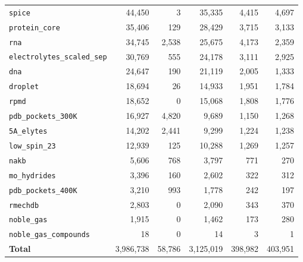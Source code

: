 \begin{table}[h]
\begin{tabular}{lrrrrr}
\texttt{spice} & 44{,}450 & 3 & 35{,}335 & 4{,}415 & 4{,}697 \\
\texttt{protein\_core} & 35{,}406 & 129 & 28{,}429 & 3{,}715 & 3{,}133 \\
\texttt{rna} & 34{,}745 & 2{,}538 & 25{,}675 & 4{,}173 & 2{,}359 \\
\texttt{electrolytes\_scaled\_sep} & 30{,}769 & 555 & 24{,}178 & 3{,}111 & 2{,}925 \\
\texttt{dna} & 24{,}647 & 190 & 21{,}119 & 2{,}005 & 1{,}333 \\
\texttt{droplet} & 18{,}694 & 26 & 14{,}933 & 1{,}951 & 1{,}784 \\
\texttt{rpmd} & 18{,}652 & 0 & 15{,}068 & 1{,}808 & 1{,}776 \\
\texttt{pdb\_pockets\_300K} & 16{,}927 & 4{,}820 & 9{,}689 & 1{,}150 & 1{,}268 \\
\texttt{5A\_elytes} & 14{,}202 & 2{,}441 & 9{,}299 & 1{,}224 & 1{,}238 \\
\texttt{low\_spin\_23} & 12{,}939 & 125 & 10{,}288 & 1{,}269 & 1{,}257 \\
\texttt{nakb} & 5{,}606 & 768 & 3{,}797 & 771 & 270 \\
\texttt{mo\_hydrides} & 3{,}396 & 160 & 2{,}602 & 322 & 312 \\
\texttt{pdb\_pockets\_400K} & 3{,}210 & 993 & 1{,}778 & 242 & 197 \\
\texttt{rmechdb} & 2{,}803 & 0 & 2{,}090 & 343 & 370 \\
\texttt{noble\_gas} & 1{,}915 & 0 & 1{,}462 & 173 & 280 \\
\texttt{noble\_gas\_compounds} & 18 & 0 & 14 & 3 & 1 \\
\midrule
\textbf{Total} & 3{,}986{,}738 & 58{,}786 & 3{,}125{,}019 & 398{,}982 & 403{,}951 \\
\bottomrule
\end{tabular}
\end{table}

